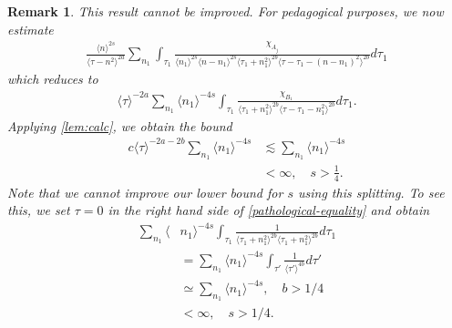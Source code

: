 \documentclass[12pt,reqno]{amsart}
\numberwithin{equation}{section}  %
\newtheorem{remark}[theorem]{Remark}
\begin{document}
\begin{framed}
  \begin{remark}
This result cannot be improved. For pedagogical purposes, we now estimate 
%
\begin{equation*}
  \begin{split}
     \frac{ \langle n
     \rangle ^{2s}}{\langle \tau - n^{2} \rangle ^{2a}}
    \sum_{n_{1}} \int_{\tau_{1}} \frac{\chi_{A_{j}}}{ \langle n_{1} \rangle ^{2s} \langle n-n_{1} \rangle ^{2s} 
    \langle \tau_{1} + n_{1}^{2} \rangle^{2b} \langle  \tau - \tau_{1} -
    (n - n_{1})^{2} \rangle^{2b} } 
    d \tau_1  
  \end{split}
\end{equation*}
which reduces to
%
\begin{equation}
  \label{pathological-equality}
\begin{split}
   \langle \tau \rangle ^{-2a} \sum_{n_{1}} \langle
   n_{1}\rangle ^{-4s} \int_{\tau_{1}} \frac{\chi_{B_{1}}}{\langle \tau_{1} + n_{1}^{2} \rangle^{2b} \langle
  \tau - \tau_{1} - n_{1}^{2}\rangle^{2b} }d \tau_{1}.
\end{split}
\end{equation}
Applying \cref{lem:calc}, we obtain the bound
%
%
\begin{equation*}
\begin{split}
  c  \langle \tau \rangle
  ^{-2a-2b} \sum_{n_{1}} \langle n_{1} \rangle
  ^{-4s} 
  & \lesssim \sum_{n_{1}} \langle n_{1} \rangle ^{-4s}
  \\
  & < \infty, \quad s > \frac{1}{4}.
\end{split}
\end{equation*}
%
%
Note that we cannot improve our lower bound for $s$ using this splitting.
To see this, we set $\tau = 0$
in the right hand side of \eqref{pathological-equality} and obtain
%
%
%
\begin{equation*}
\begin{split}
   \sum_{n_{1}} \langle
   & n_{1}\rangle ^{-4s} \int_{\tau_{1}} \frac{1}{\langle \tau_{1} + n_{1}^{2} \rangle^{2b} \langle
   \tau_{1} + n_{1}^{2}\rangle^{2b} }d \tau_{1} 
   \\
   & = \sum_{n_{1}} \langle
  n_{1}\rangle ^{-4s} \int_{\tau'} \frac{1}{\langle
   \tau' \rangle ^{4b}}d \tau'
   \\
   & \simeq \sum_{n_{1}} \langle n_{1} \rangle ^{-4s}, \quad b > 1/4
   \\
   & < \infty, \quad s > 1/4.
\end{split}
\end{equation*}

\end{remark}
\end{framed}
\end{document}
